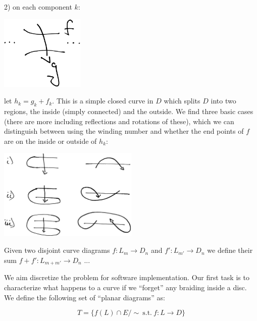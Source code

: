 \documentclass[12pt,a4paper]{article}
\begin{document}
2) on each component $k$:

\begin{center}
\includegraphics[width=0.3\textwidth]{snake-component.eps}
\end{center}

let $h_k = g_k + f_k.$
This is a simple closed curve in $D$ which splits $D$
into two regions, the inside (simply connected) and the
outside.
We find three basic cases (there are more including reflections
and rotations of these), which we can distinguish between
using the winding number and whether the end points
of $f$ are on the inside or outside of $h_k$:

\begin{center}
\includegraphics[width=0.5\textwidth]{snake-cases.eps}
\end{center}




Given two disjoint curve diagrams $f:L_m\to D_n$ and $f':L_{m'}\to D_n$
we define their sum  $f+f':L_{m+m'}\to D_n$ ...




We aim discretize the problem for software implementation.
Our first task is to characterize what happens to a curve
if we ``forget'' any braiding inside a disc.
We define the following set of ``planar diagrams'' as:

    $$ T = \{ f(L)\cap E / \sim \ \text{s.t.}\ f:L\to D \}$$
\end{document}
